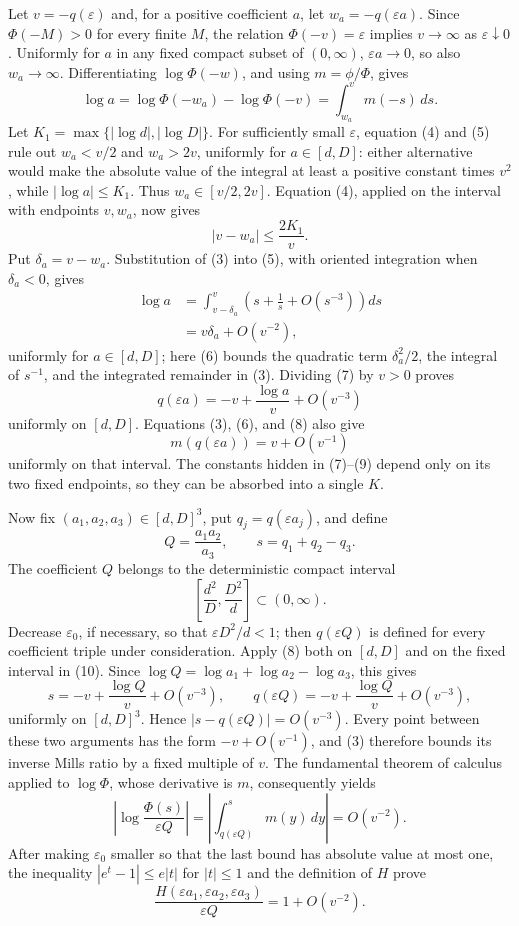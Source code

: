 Let \(v=-q(\varepsilon)\) and, for a positive coefficient \(a\), let \(w_a=-q(\varepsilon a)\). Since \(\Phi(-M)>0\) for every finite \(M\), the relation \(\Phi(-v)=\varepsilon\) implies \(v\to\infty\) as \(\varepsilon\downarrow0\). Uniformly for \(a\) in any fixed compact subset of \((0,\infty)\), \(\varepsilon a\to0\), so also \(w_a\to\infty\). Differentiating \(\log\Phi(-w)\), and using \(m=\phi/\Phi\), gives
\[
 \log a
 =\log\Phi(-w_a)-\log\Phi(-v)
 =\int_{w_a}^{v}m(-s)\,ds.
\tag{5}
\]
Let \(K_1=\max\{|\log d|,|\log D|\}\). For sufficiently small \(\varepsilon\), equation (4) and (5) rule out \(w_a<v/2\) and \(w_a>2v\), uniformly for \(a\in[d,D]\): either alternative would make the absolute value of the integral at least a positive constant times \(v^2\), while \(|\log a|\leq K_1\). Thus \(w_a\in[v/2,2v]\). Equation (4), applied on the interval with endpoints \(v,w_a\), now gives
\[
 |v-w_a|\leq\frac{2K_1}{v}.
\tag{6}
\]
Put \(\delta_a=v-w_a\). Substitution of (3) into (5), with oriented integration when \(\delta_a<0\), gives
\[
 \begin{aligned}
 \log a
 &=\int_{v-\delta_a}^{v}
 \left(s+\frac1s+O(s^{-3})\right)ds\\
 &=v\delta_a+O(v^{-2}),
 \end{aligned}
\tag{7}
\]
uniformly for \(a\in[d,D]\); here (6) bounds the quadratic term \(\delta_a^2/2\), the integral of \(s^{-1}\), and the integrated remainder in (3). Dividing (7) by \(v>0\) proves
\[
 q(\varepsilon a)=-v+\frac{\log a}{v}+O(v^{-3})
\tag{8}
\]
uniformly on \([d,D]\). Equations (3), (6), and (8) also give
\[
 m(q(\varepsilon a))=v+O(v^{-1})
\tag{9}
\]
uniformly on that interval. The constants hidden in (7)--(9) depend only on its two fixed endpoints, so they can be absorbed into a single \(K\).

Now fix \((a_1,a_2,a_3)\in[d,D]^3\), put \(q_j=q(\varepsilon a_j)\), and define
\[
 Q=\frac{a_1a_2}{a_3},
 \qquad s=q_1+q_2-q_3.
\]
The coefficient \(Q\) belongs to the deterministic compact interval
\[
 \left[\frac{d^2}{D},\frac{D^2}{d}\right]\subset(0,\infty).
\tag{10}
\]
Decrease \(\varepsilon_0\), if necessary, so that \(\varepsilon D^2/d<1\); then \(q(\varepsilon Q)\) is defined for every coefficient triple under consideration.
Apply (8) both on \([d,D]\) and on the fixed interval in (10). Since \(\log Q=\log a_1+\log a_2-\log a_3\), this gives
\[
 s=-v+\frac{\log Q}{v}+O(v^{-3}),
 \qquad
 q(\varepsilon Q)=-v+\frac{\log Q}{v}+O(v^{-3}),
\tag{11}
\]
uniformly on \([d,D]^3\). Hence \(|s-q(\varepsilon Q)|=O(v^{-3})\). Every point between these two arguments has the form \(-v+O(v^{-1})\), and (3) therefore bounds its inverse Mills ratio by a fixed multiple of \(v\). The fundamental theorem of calculus applied to \(\log\Phi\), whose derivative is \(m\), consequently yields
\[
 \left|\log\frac{\Phi(s)}{\varepsilon Q}\right|
 =\left|\int_{q(\varepsilon Q)}^s m(y)\,dy\right|
 =O(v^{-2}).
\tag{12}
\]
After making \(\varepsilon_0\) smaller so that the last bound has absolute value at most one, the inequality \(|e^t-1|\leq e|t|\) for \(|t|\leq1\) and the definition of \(H\) prove
\[
 \frac{H(\varepsilon a_1,\varepsilon a_2,\varepsilon a_3)}{\varepsilon Q}
 =1+O(v^{-2}).
\tag{13}
\]

